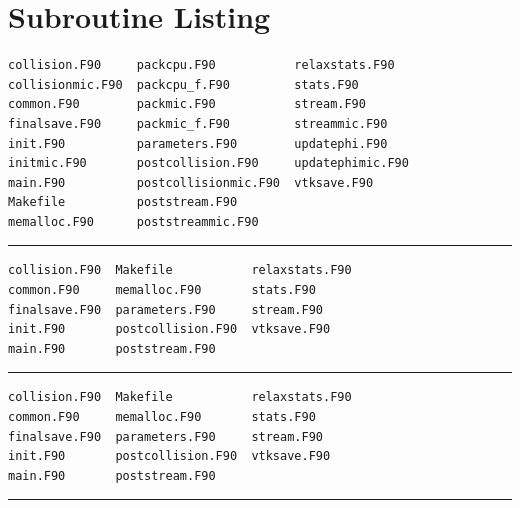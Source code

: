\documentclass[12pt]{report}
\begin{document}
\chapter{Subroutine Listing}

\vspace{-1em}

\begin{verbatim}
collision.F90     packcpu.F90           relaxstats.F90
collisionmic.F90  packcpu_f.F90         stats.F90
common.F90        packmic.F90           stream.F90
finalsave.F90     packmic_f.F90         streammic.F90
init.F90          parameters.F90        updatephi.F90
initmic.F90       postcollision.F90     updatephimic.F90
main.F90          postcollisionmic.F90  vtksave.F90
Makefile          poststream.F90
memalloc.F90      poststreammic.F90
\end{verbatim}
\hrule\vspace{1em}


\vspace{-1em}

\begin{verbatim}
collision.F90  Makefile           relaxstats.F90
common.F90     memalloc.F90       stats.F90
finalsave.F90  parameters.F90     stream.F90
init.F90       postcollision.F90  vtksave.F90
main.F90       poststream.F90
\end{verbatim}
\hrule\vspace{1em}

\vspace{-1em}

\begin{verbatim}
collision.F90  Makefile           relaxstats.F90
common.F90     memalloc.F90       stats.F90
finalsave.F90  parameters.F90     stream.F90
init.F90       postcollision.F90  vtksave.F90
main.F90       poststream.F90
\end{verbatim}
\hrule\vspace{1em}
\end{document}
